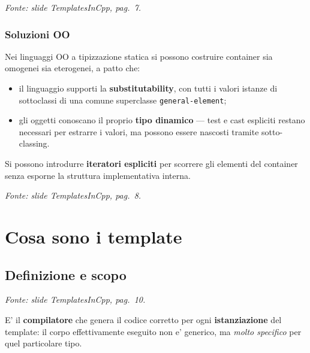 \documentclass{report}
\newcommand{\code}[1]{\texttt{\small #1}}
\newcommand{\fonteslide}[1]{{\footnotesize\itshape\color{gray} Fonte: slide \emph{TemplatesInCpp}, pag.~#1.\par}}
\begin{document}
\fonteslide{7}

\subsection{Soluzioni OO}

Nei linguaggi OO a tipizzazione statica si possono costruire container sia
omogenei sia eterogenei, a patto che:

\begin{itemize}
    \item il linguaggio supporti la \textbf{substitutability}, con tutti i
          valori istanze di sottoclassi di una comune superclasse
          \code{general-element};
    \item gli oggetti conoscano il proprio \textbf{tipo dinamico} --- test e
          cast espliciti restano necessari per estrarre i valori, ma possono
          essere nascosti tramite sotto-classing.
\end{itemize}

Si possono introdurre \textbf{iteratori espliciti} per scorrere gli elementi
del container senza esporne la struttura implementativa interna.


\fonteslide{8}

\chapter{Cosa sono i template}\label{ch:cosa}

\section{Definizione e scopo}


\fonteslide{10}

E' il \textbf{compilatore} che genera il codice corretto per ogni
\textbf{istanziazione} del template: il corpo effettivamente eseguito non e'
generico, ma \emph{molto specifico} per quel particolare tipo.
\end{document}
